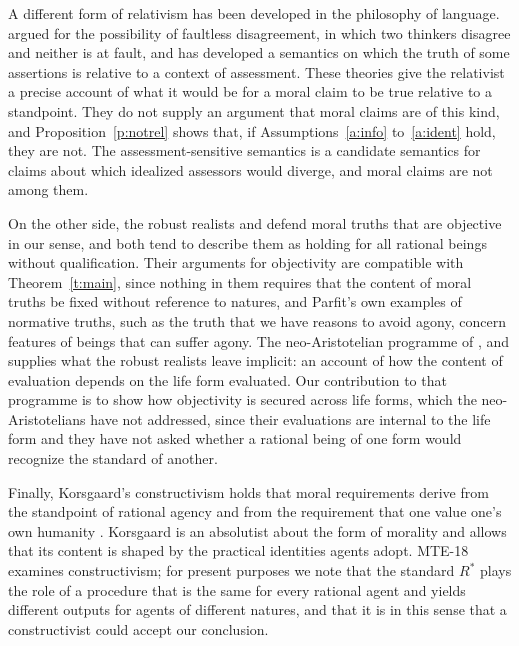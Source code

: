 \documentclass{situationist-preprint}
\begin{document}
A different form of relativism has been developed in the philosophy of language. \citet{Kolbel2004} argued for the possibility of faultless disagreement, in which two thinkers disagree and neither is at fault, and \citet{MacFarlane2014} has developed a semantics on which the truth of some assertions is relative to a context of assessment. These theories give the relativist a precise account of what it would be for a moral claim to be true relative to a standpoint. They do not supply an argument that moral claims are of this kind, and Proposition~\ref{p:notrel} shows that, if Assumptions~\ref{a:info} to~\ref{a:ident} hold, they are not. The assessment-sensitive semantics is a candidate semantics for claims about which idealized assessors would diverge, and moral claims are not among them.

On the other side, the robust realists \citet{Enoch2011} and \citet{Parfit2011} defend moral truths that are objective in our sense, and both tend to describe them as holding for all rational beings without qualification. Their arguments for objectivity are compatible with Theorem~\ref{t:main}, since nothing in them requires that the content of moral truths be fixed without reference to natures, and Parfit's own examples of normative truths, such as the truth that we have reasons to avoid agony, concern features of beings that can suffer agony. The neo-Aristotelian programme of \citet{Foot2001}, \citet{Thompson2008} and \citet{Hursthouse1999} supplies what the robust realists leave implicit: an account of how the content of evaluation depends on the life form evaluated. Our contribution to that programme is to show how objectivity is secured across life forms, which the neo-Aristotelians have not addressed, since their evaluations are internal to the life form and they have not asked whether a rational being of one form would recognize the standard of another.

Finally, Korsgaard's constructivism holds that moral requirements derive from the standpoint of rational agency and from the requirement that one value one's own humanity \citep{Korsgaard1996}. Korsgaard is an absolutist about the form of morality and allows that its content is shaped by the practical identities agents adopt. MTE-18 examines constructivism; for present purposes we note that the standard $R^*$ plays the role of a procedure that is the same for every rational agent and yields different outputs for agents of different natures, and that it is in this sense that a constructivist could accept our conclusion.
\end{document}

